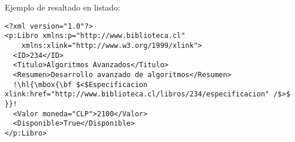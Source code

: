 Ejemplo de resaltado en listado:

\begin{lstlisting}[escapechar=!,caption=Libro en particular obtenido del Servicio Web.,label=xmlresourceforone]
<?xml version="1.0"?>
<p:Libro xmlns:p="http://www.biblioteca.cl"
    xmlns:xlink="http://www.w3.org/1999/xlink">
  <ID>234</ID>
  <Titulo>Algoritmos Avanzados</Titulo>
  <Resumen>Desarrollo avanzado de algoritmos</Resumen>
  !\hl{\mbox{\bf $<$Especificacion xlink:href="http://www.biblioteca.cl/libros/234/especificacion" /$>$ }}!
  <Valor moneda="CLP">2100</Valor>
  <Disponible>True</Disponible>
</p:Libro>
\end{lstlisting}


